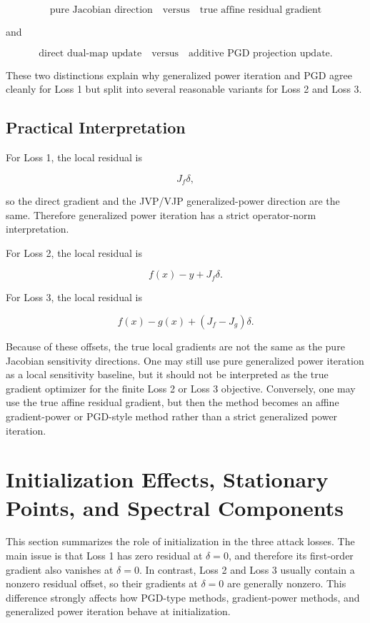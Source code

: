\documentclass{article}
\begin{document}
\[
\boxed{
\text{pure Jacobian direction}
\quad \text{versus} \quad
\text{true affine residual gradient}
}
\]

and

\[
\boxed{
\text{direct dual-map update}
\quad \text{versus} \quad
\text{additive PGD projection update}.
}
\]

These two distinctions explain why generalized power iteration and PGD agree cleanly for Loss 1 but split into several reasonable variants for Loss 2 and Loss 3.

\subsection{Practical Interpretation}

For Loss 1, the local residual is

\[
J_f\delta,
\]

so the direct gradient and the JVP/VJP generalized-power direction are the same. Therefore generalized power iteration has a strict operator-norm interpretation.

For Loss 2, the local residual is

\[
f(x)-y+J_f\delta.
\]

For Loss 3, the local residual is

\[
f(x)-g(x)+(J_f-J_g)\delta.
\]

Because of these offsets, the true local gradients are not the same as the pure Jacobian sensitivity directions. One may still use pure generalized power iteration as a local sensitivity baseline, but it should not be interpreted as the true gradient optimizer for the finite Loss 2 or Loss 3 objective. Conversely, one may use the true affine residual gradient, but then the method becomes an affine gradient-power or PGD-style method rather than a strict generalized power iteration.

\section{Initialization Effects, Stationary Points, and Spectral Components}

This section summarizes the role of initialization in the three attack losses. The main issue is that Loss 1 has zero residual at \(\delta=0\), and therefore its first-order gradient also vanishes at \(\delta=0\). In contrast, Loss 2 and Loss 3 usually contain a nonzero residual offset, so their gradients at \(\delta=0\) are generally nonzero. This difference strongly affects how PGD-type methods, gradient-power methods, and generalized power iteration behave at initialization.
\end{document}
